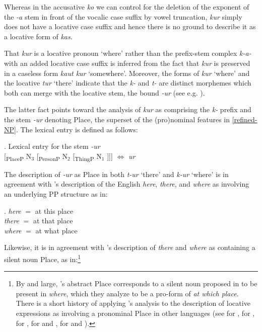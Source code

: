 \noindent Whereas in the accusative \textit{ko} we can control for the deletion of the exponent of the  \textit{-a} stem in front of the vocalic case suffix by vowel  truncation, \textit{kur} simply does not have a locative case suffix and hence there is no ground to describe it as a locative form of \textit{kas}.  
\par 
That \textit{kur} is a locative pronoun `where' rather than the prefix-stem complex \textit{k-a-} with an added locative case suffix is inferred from the fact that \textit{kur} is preserved in a caseless form \textit{kaut kur} `somewhere'. Moreover, the forms of \textit{kur} `where' and the locative  \textit{tur} `there' indicate that the \textit{k-} and \textit{t-} are distinct morphemes which both can merge with the locative stem, the bound  \textit{-ur} (see e.g. \citealt{Praulins2012}).
\par
The latter fact points toward the analysis of \textit{kur} as comprising the \textit{k-} prefix and the stem \textit{-ur} denoting Place, the superset of the (pro)nominal features in \ref{refined-NP}. The lexical entry is defined as follows:

\ex. Lexical entry for the  stem \textit{-ur}\label{Lat:lex-ur}\\[0.5ex]
[\textsubscript{PlaceP} N$_{3}$ [\textsubscript{PersonP} N$_{2}$ [\textsubscript{ThingP} N$_{1}$ ]]] $\Leftrightarrow$ \textit{ur}

The description of \textit{-ur} as Place in both \textit{t-ur} `there' and \textit{k-ur} `where' is in agreement with \citeauthor{Katz-Postal1964}'s \citeyearpar{Katz-Postal1964} description of the English \textit{here}, \textit{there}, and \textit{where} as involving an underlying PP structure as in:

\ex. 
\textit{here}	$=$	at this place\\
\textit{there} $=$ at that place\\
\textit{where} $=$ at what place

\noindent Likewise, it is in agreement with \citeauthor{Kayne2007}'s \citeyearpar{Kayne2007} description of \textit{there} and \textit{where} as containing a silent noun Place, as in:\footnote{By and large, \citeauthor{Kayne2007}'s \citeyearpar{Kayne2007} abstract Place corresponds to a silent noun proposed in \cite{Katz-Postal1964} to be present in \textit{where}, which they analyze to be a pro-form of \textit{at which place}. There is a short history of applying \citeauthor{Kayne2007}'s \citeyearpar{Kayne2007} analysis to the description of locative expressions as involving a pronominal Place in other languages (see \citealt{Pantcheva2008} for , \citealt{Leu2015} for , \citealt{CahaPantcheva-Shona} for , \citealt{BR-T2008} for  and , \citealt{Wiland-PSiCL} for  and ).
}%

